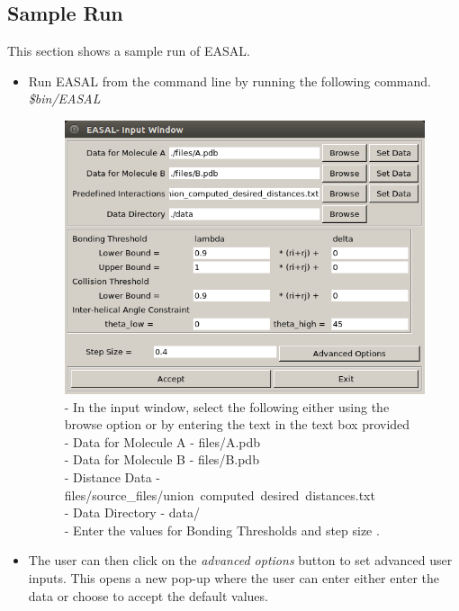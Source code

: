 \documentclass[10pt]{article}
\begin{document}
\subsection{Sample Run}
\label{sec:run}
This section shows a sample run of EASAL.

\begin{itemize}

\item Run EASAL from the command line by running the following command.
    \emph{\$bin/EASAL}

\begin{figure}
	\centering
	\includegraphics[scale=0.5] {fig/InputWindow.png}
	\caption{- In the input window, select the following either using the
			browse option or by entering the text in the text box provided\\
    - Data for Molecule A - files/A.pdb\\
    - Data for Molecule B - files/B.pdb\\
    - Distance Data - files/source\_files/union\ computed\ desired\ distances.txt\\
    - Data Directory - data/\\
    - Enter the values for Bonding Thresholds and step size .
}
	\label{inputwindow}
\end{figure}


\item The user can then click on the \emph{advanced options} button to set advanced
		user inputs. This opens a new pop-up where the user can enter either
		enter the data or choose to accept the default values.


\end{itemize}
\end{document}
